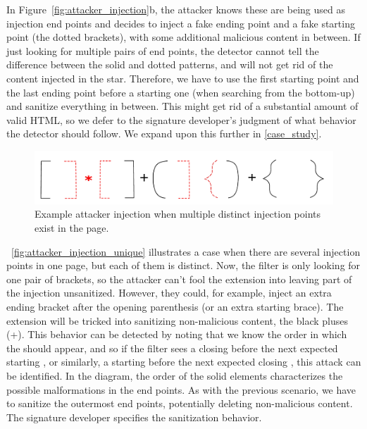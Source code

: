 In Figure~\ref{fig:attacker_injection}b, the attacker knows these are
being used as injection end points and decides to inject a fake ending
point and a fake starting point (the dotted brackets), with some
additional malicious content in between. If just looking for multiple
pairs of end points, the detector cannot tell the difference between
the solid and dotted patterns, and will not get rid of the content
injected in the star. Therefore, we have to use the first starting
point and the last ending point before a starting one (when searching
from the bottom-up) and sanitize everything in between. This might get
rid of a substantial amount of valid HTML, so we defer to the
signature developer's judgment of what behavior the detector should
follow. We expand upon this further in \autoref{case_study}.


\begin{figure}[h]
	\begin{center}
	\includegraphics[scale=0.25]{img/attacker_injection_unique.pdf}
	\caption{Example attacker injection when multiple distinct injection points exist in the page.}
	\label{fig:attacker_injection_unique}
	\end{center}
\end{figure}


~\autoref{fig:attacker_injection_unique} illustrates a case when
there are several injection points in one page, but each of them is
distinct. Now, the filter is only looking for one pair of brackets, so
the attacker can't fool the extension into leaving part of the
injection unsanitized. However, they could, for example, inject an
extra ending bracket after the opening parenthesis (or an extra
starting brace). The extension will be tricked into sanitizing
non-malicious content, the black pluses (+). This behavior can be
detected by noting that we know the order in which the
 should appear, and so if the filter sees a closing
 before the next expected starting , or
similarly, a starting  before the next expected closing
, this attack can be identified. In the diagram, the
order of the solid elements characterizes the possible malformations
in the end points. As with the previous scenario, we have to sanitize
the outermost end points, potentially deleting non-malicious
content. The signature developer specifies the sanitization behavior.

